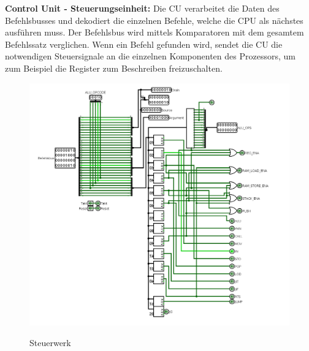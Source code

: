\documentclass[12pt]{article}
\begin{document}
\textbf{Control Unit - Steuerungseinheit: } Die CU verarbeitet die Daten des Befehlsbusses und dekodiert die einzelnen Befehle, welche die CPU als nächstes ausführen muss. Der Befehlsbus wird mittels Komparatoren mit dem gesamtem Befehlssatz verglichen. Wenn ein Befehl gefunden wird, sendet die CU die notwendigen Steuersignale an die einzelnen Komponenten des Prozessors, um zum Beispiel die Register zum Beschreiben freizuschalten.


\begin{figure}[!htbp]
\includegraphics[scale=0.35]{cu}
\centering
\label{fig:cu}
\caption{Steuerwerk}
\end{figure}
\newpage
\newpage
\end{document}
